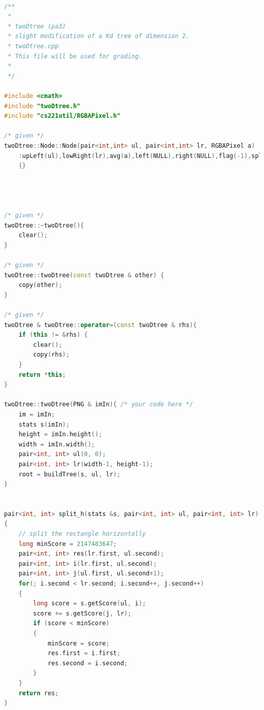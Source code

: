 \documentclass[UTF8]{ctexart}
\begin{document}
\begin{lstlisting}[language=C++,caption={twoDTree.cpp},label={twoDTree.cpp}]

/**
 *
 * twoDtree (pa3)
 * slight modification of a Kd tree of dimension 2.
 * twoDtree.cpp
 * This file will be used for grading.
 *
 */

#include <cmath>
#include "twoDtree.h"
#include "cs221util/RGBAPixel.h"

/* given */
twoDtree::Node::Node(pair<int,int> ul, pair<int,int> lr, RGBAPixel a)
	:upLeft(ul),lowRight(lr),avg(a),left(NULL),right(NULL),flag(-1),split_value(-1)
	{}




/* given */
twoDtree::~twoDtree(){
	clear();
}

/* given */
twoDtree::twoDtree(const twoDtree & other) {
	copy(other);
}

/* given */
twoDtree & twoDtree::operator=(const twoDtree & rhs){
	if (this != &rhs) {
		clear();
		copy(rhs);
	}
	return *this;
}

twoDtree::twoDtree(PNG & imIn){ /* your code here */ 
    im = imIn;
    stats s(imIn);
    height = imIn.height();
    width = imIn.width();
    pair<int, int> ul(0, 0);
    pair<int, int> lr(width-1, height-1);
    root = buildTree(s, ul, lr);
}


pair<int, int> split_h(stats &s, pair<int, int> ul, pair<int, int> lr)
{
    // split the rectangle horizontally
    long minScore = 2147483647;
    pair<int, int> res(lr.first, ul.second);
    pair<int, int> i(lr.first, ul.second);
    pair<int, int> j(ul.first, ul.second+1);
    for(; i.second < lr.second; i.second++, j.second++)
    {
        long score = s.getScore(ul, i);
        score += s.getScore(j, lr);
        if (score < minScore)
        {
            minScore = score;
            res.first = i.first;
            res.second = i.second;
        }
    }
    return res;
}


\end{lstlisting}
\end{document}
